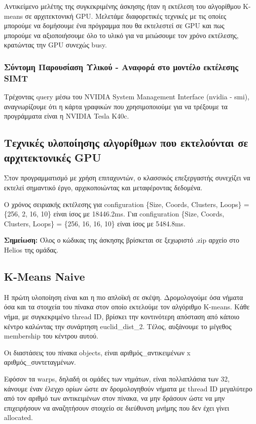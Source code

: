 \documentclass[../final_report.tex]{subfiles}
\begin{document}
Αντικείμενο μελέτης της συγκεκριμένης άσκησης ήταν η εκτέλεση του αλγορίθμου K-means σε αρχιτεκτονική GPU.
Μελετάμε διαφορετικές τεχνικές με τις οποίες μπορούμε να δομήσουμε ένα πρόγραμμα που θα εκτελεστεί σε GPU και πως
μπορούμε να αξιοποιήσουμε όλο το υλικό για να μειώσουμε τον χρόνο εκτέλεσης, κρατώντας την GPU συνεχώς busy.

\subsubsection*{Σύντομη Παρουσίαση Υλικού - Αναφορά στο μοντέλο εκτέλεσης SIMT}

Τρέχοντας query μέσω του NVIDIA System Management Interface (nvidia - smi), αναγνωρίζουμε ότι η κάρτα γραφικών που
χρησιμοποιούμε για να τρέξουμε τα προγράμματα είναι η NVIDIA Tesla K40c.

\subsection{Τεχνικές υλοποίησης αλγορίθμων που εκτελούνται σε αρχιτεκτονικές GPU}

Στον προγραμματισμό με χρήση επιταχυντών, ο κλασσικός επεξεργαστής συνεχίζει να εκτελεί σημαντικό έργο, αρχικοποιώντας
και μεταφέροντας δεδομένα.

Ο χρόνος σειριακής εκτέλεσης για configuration \{Size, Coords, Clusters, Loops\} = \{256, 2, 16, 10\} είναι ίσος με 18446.2ms.
Για configuration \{Size, Coords, Clusters, Loops\} = \{256, 16, 16, 10\} είναι ίσος με 5484.8ms.

\textbf{Σημείωση:} Όλος ο κώδικας της άσκησης βρίσκεται σε ξεχωριστό .zip αρχείο στο Helios της ομάδας.


\subsection{K-Means Naive}
Η πρώτη υλοποίηση είναι και η πιο απλοϊκή σε σκέψη. Δρομολογούμε όσα νήματα όσα και τα στοιχεία του πίνακα στον οποίο εκτελούμε
τον αλγόριθμο K-means. Κάθε νήμα, με συγκεκριμένο thread ID, βρίσκει την κοντινότερη απόσταση από κάποιο κέντρο καλώντας την συνάρτηση euclid\_dist\_2.
Τέλος, αυξάνουμε το μέγεθος membership του κέντρου αυτού.

Οι διαστάσεις του πίνακα objects, είναι αριθμός\_αντικειμένων x αριθμός\_συντεταγμένων. 

Εφόσον τα warps, δηλαδή οι ομάδες των νημάτων, είναι πολλαπλάσια των 32, κάνουμε έναν έλεγχο ορίων ώστε αν δρομολογηθούν νήματα με 
thread ID μεγαλύτερο από τον αριθμό των αντικειμένων στον πίνακα, να μην δράσουν ώστε να μην επιχειρήσουν να αναζητήσουν στοιχείο σε 
διεύθυνση μνήμης που δεν έχει γίνει allocated.
\end{document}
